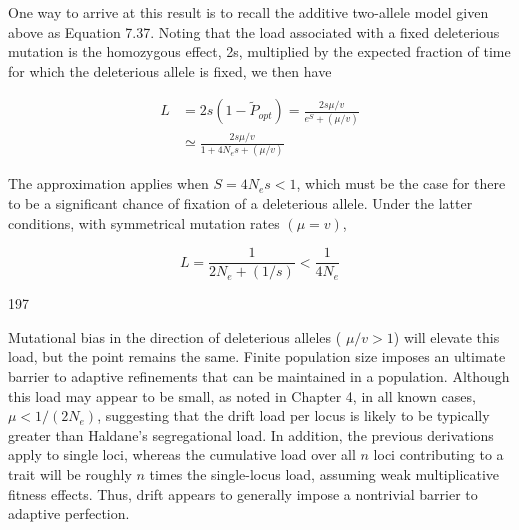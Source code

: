 \documentclass{article}
\begin{document}
One way to arrive at this result is to recall the additive two-allele model given above as Equation 7.37. Noting that the load associated with a fixed deleterious mutation is the homozygous effect, 2s, multiplied by the expected fraction of time for which the deleterious allele is fixed, we then have

\begin{equation}
\begin{aligned}L&=2s(1-\widetilde{P}_{opt})=\frac{2s\mu/v}{e^{S}+(\mu/v)}\\&\simeq\frac{2s\mu/v}{1+4N_{e}s+(\mu/v)}\end{aligned}
\tag{7.42a}
\label{eq:7_42a}
\end{equation}

The approximation applies when  $ S = 4N_e s < 1 $, which must be the case for there to be a significant chance of fixation of a deleterious allele. Under the latter conditions, with symmetrical mutation rates  $ (\mu = v) $,

\begin{equation}
L=\frac{1}{2N_{e}+\left(1/s\right)}<\frac{1}{4N_{e}}
\tag{7.42b}
\label{eq:7_42b}
\end{equation}

197

Mutational bias in the direction of deleterious alleles ( $ \mu/v > 1 $) will elevate this load, but the point remains the same. Finite population size imposes an ultimate barrier to adaptive refinements that can be maintained in a population. Although this load may appear to be small, as noted in Chapter 4, in all known cases,  $ \mu < 1/(2N_e) $, suggesting that the drift load per locus is likely to be typically greater than Haldane's segregational load. In addition, the previous derivations apply to single loci, whereas the cumulative load over all  $ n $ loci contributing to a trait will be roughly  $ n $ times the single-locus load, assuming weak multiplicative fitness effects. Thus, drift appears to generally impose a nontrivial barrier to adaptive perfection.
\end{document}
